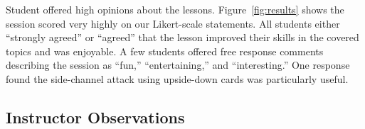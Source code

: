 
Student offered high opinions about the lessons. Figure~\ref{fig:results}
shows the session scored very highly on our Likert-scale statements.
All students
either ``strongly agreed'' or ``agreed''
that the lesson improved their skills in the covered topics
and was enjoyable.
A few students offered free response comments describing the
session as ``fun,'' ``entertaining,'' and ``interesting.''  One response
found the side-channel attack using upside-down cards
was particularly useful.


%
%


\subsection{Instructor Observations}

